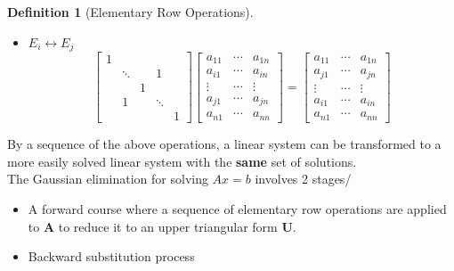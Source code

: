\documentclass[12pt]{article}
\newtheorem{definition}{Definition}[section]
\theoremstyle{definition}
\begin{document}
\begin{definition}[Elementary Row Operations]
\begin{itemize}
\[\begin{bmatrix}
a_{11}&\cdots&a_{1n}\\
\vdots&&\vdots\\
 a_{i1}-la_{j1}&\cdots&a_{in}-la_{jn}\\
\vdots&&\vdots\\
a_{n1}&\cdots&a_{nn}
\end{bmatrix}
\]
\item $E_i\leftrightarrow E_j$
\[
\begin{bmatrix}
1&&&&\\
&\ddots&&1&\\
&&1&&\\
&1&&\ddots&\\
&&&&1
\end{bmatrix}\begin{bmatrix}
a_{11}&\cdots&a_{1n}\\
a_{i1}&\cdots&a_{in}\\
\vdots&\cdots&\vdots\\
a_{j1}&\cdots&a_{jn}\\
a_{n1}&\cdots&a_{nn}
\end{bmatrix}=\begin{bmatrix}
a_{11}&\cdots&a_{1n}\\
a_{j1}&\cdots&a_{jn}\\
\vdots&\cdots&\vdots\\
a_{i1}&\cdots&a_{in}\\
a_{n1}&\cdots&a_{nn}
\end{bmatrix}
\]
\end{itemize}
\end{definition}
By a sequence of the above operations, a linear system can be transformed to a more easily solved linear system with the \textbf{same} set of solutions.\\
The Gaussian elimination for solving $Ax=b$ involves 2 stages/
\begin{itemize}
\item A forward course where a sequence of elementary row operations are applied to $\mathbf{A}$ to reduce it to an upper triangular form $\mathbf{U}$.
\item Backward substitution process
\end{itemize}
\end{document}
